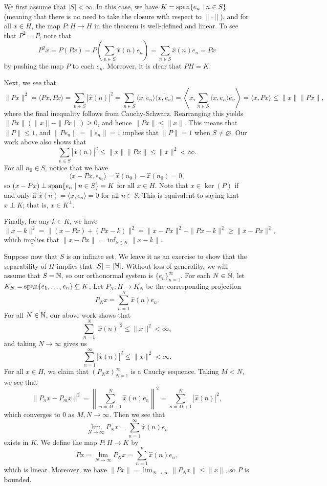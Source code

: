 \begin{pf}
    We first assume that $|S| < \infty$. In this case, we have 
    $K = \operatorname{span}\{e_n \mid n \in S\}$ (meaning that there is no need to 
    take the closure with respect to $\|\cdot\|$), and for all $x \in H$, 
    the map $P : H \to H$ in the theorem is well-defined and linear. 
    To see that $P^2 = P$, note that 
    \[ P^2x = P(Px) = P\left( \sum_{n\in S} \hat x(n) e_n \right) 
    = \sum_{n\in S} \hat x(n) e_n = Px \] 
    by pushing the map $P$ to each $e_n$. Moreover, it is clear that $PH = K$. 

    Next, we see that 
    \[ \|Px\|^2 = \langle Px, Px \rangle = \sum_{n\in S} |\hat x(n)|^2 
    = \sum_{n\in S} \langle x, e_n \rangle \overline{\langle x, e_n \rangle} 
    = \left\langle x, \sum_{n\in S} \langle x, e_n \rangle e_n \right\rangle 
    = \langle x, Px \rangle \leq \|x\|\|Px\|, \] 
    where the final inequality follows from Cauchy-Schwarz. Rearranging 
    this yields $\|Px\|(\|x\| - \|Px\|) \geq 0$, and hence $\|Px\| \leq \|x\|$. 
    This means that $\|P\| \leq 1$, and $\|Pe_n\| = \|e_n\| = 1$ implies that 
    $\|P\| = 1$ when $S \neq \varnothing$. Our work above also shows that 
    \[ \sum_{n\in S} |\hat x(n)|^2 \leq \|x\|\|Px\| \leq \|x\|^2 < \infty. \] 
    For all $n_0 \in S$, notice that we have 
    \[ \langle x - Px, e_{n_0} \rangle = \hat x(n_0) - \hat x(n_0) = 0, \] 
    so $(x - Px) \perp \operatorname{span}\{e_n \mid n \in S\} = K$ for all $x \in H$. 
    Note that $x \in \ker(P)$ if and only if $\hat x(n) = \langle x, e_n 
    \rangle = 0$ for all $n \in S$. This is equivalent to saying that 
    $x \perp K$; that is, $x \in K^\perp$. 

    Finally, for any $k \in K$, we have 
    \[ \|x - k\|^2 = \|(x - Px) + (Px - k)\|^2 = \|x - Px\|^2 + 
    \|Px - k\|^2 \geq \|x - Px\|^2, \] 
    which implies that $\|x - Px\| = \inf_{k\in K} \|x - k\|$. 

    Suppose now that $S$ is an infinite set. We leave it as an exercise 
    to show that the separability of $H$ implies that $|S| = |\mathbb{N}|$. 
    Without loss of generality, we will assume that $S = \mathbb{N}$, 
    so our orthonormal system is $\{e_n\}_{n=1}^\infty$. For each 
    $N \in \mathbb{N}$, let $K_N = \operatorname{span}\{e_1, \dots, e_n\} \subseteq K$. 
    Let $P_N : H \to K_N$ be the corresponding projection 
    \[ P_Nx = \sum_{n=1}^N \hat x(n) e_n. \] 
    For all $N \in \mathbb{N}$, our above work shows that 
    \[ \sum_{n=1}^N |\hat x(n)|^2 \leq \|x\|^2 < \infty, \] 
    and taking $N \to \infty$ gives us 
    \[ \sum_{n=1}^\infty |\hat x(n)|^2 \leq \|x\|^2 < \infty. \] 
    For all $x \in H$, we claim that $(P_Nx)_{N=1}^\infty$ is a Cauchy 
    sequence. Taking $M < N$, we see that 
    \[ \|P_nx - P_mx\|^2 = \left\| \sum_{n=M+1}^N \hat x(n) e_n \right\|^{2}
    = \sum_{n=M+1}^N |\hat x(n)|^2, \] 
    which converges to $0$ as $M, N \to \infty$. Then we see that 
    \[ \lim_{N\to\infty} P_Nx = \sum_{n=1}^\infty \hat x(n) e_n \] 
    exists in $K$. We define the map $P : H \to K$ by 
    \[ Px = \lim_{N\to\infty} P_Nx = \sum_{n=1}^\infty \hat x(n) e_n, \] 
    which is linear. Moreover, we have $\|Px\| = \lim_{N\to\infty} 
    \|P_Nx\| \leq \|x\|$, so $P$ is bounded. 


\end{pf}
